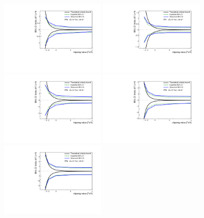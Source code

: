 \begin{figure}[ht]
   \centering
   \includegraphics[width=0.45\textwidth]{figures/aQGC/FT0limit.pdf}
   \includegraphics[width=0.45\textwidth]{figures/aQGC/FT1limit.pdf}
   \includegraphics[width=0.45\textwidth]{figures/aQGC/FT2limit.pdf}
   \includegraphics[width=0.45\textwidth]{figures/aQGC/FT5limit.pdf}
   \includegraphics[width=0.45\textwidth]{figures/aQGC/FT6limit.pdf}

\end{figure}
